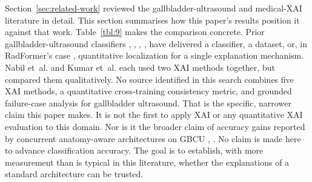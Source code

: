 Section~\ref{sec:related-work} reviewed the gallbladder-ultrasound and medical-XAI literature in detail. This section summarises how this paper's results position it against that work. Table~\ref{tbl:9} makes the comparison concrete. Prior gallbladder-ultrasound classifiers \cite{ref7}, \cite{ref17}, \cite{ref18}, \cite{ref19}, \cite{ref22} have delivered a classifier, a dataset, or, in RadFormer's case \cite{ref19}, quantitative localization for a single explanation mechanism. Nabil et~al. \cite{ref57} and Kumar et~al. \cite{ref58} each used two XAI methods together, but compared them qualitatively. No source identified in this search combines five XAI methods, a quantitative cross-training consistency metric, and grounded failure-case analysis for gallbladder ultrasound. That is the specific, narrower claim this paper makes. It is not the first to apply XAI or any quantitative XAI evaluation to this domain. Nor is it the broader claim of accuracy gains reported by concurrent anatomy-aware architectures on GBCU \cite{ref22}, \cite{ref23}. No claim is made here to advance classification accuracy. The goal is to establish, with more measurement than is typical in this literature, whether the explanations of a standard architecture can be trusted.


